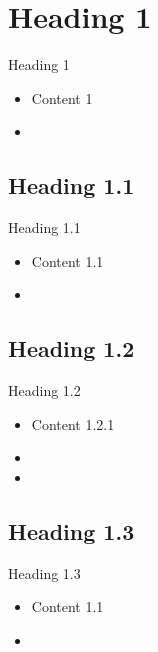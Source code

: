 \documentclass{sintefbeamer}
\title{}
\subtitle{}
\author{}
\date{}
\begin{document}
\maketitle

\section{Heading 1}

\begin{frame}{Heading 1}
    \begin{itemize}
        \item Content 1
        \item 
    \end{itemize}
\end{frame}

\subsection{Heading 1.1}

\begin{frame}{Heading 1.1}
    \begin{itemize}
        \item Content 1.1
        \item 
    \end{itemize}
\end{frame}

\subsection{Heading 1.2}

\begin{frame}{Heading 1.2}
    \begin{itemize}
        \item Content 1.2.1
        \item 
        \item 
    \end{itemize}
\end{frame}

\subsection{Heading 1.3}

\begin{frame}{Heading 1.3}
    \begin{itemize}
        \item Content 1.1
        \item 
    \end{itemize}
\end{frame}
\end{document}
